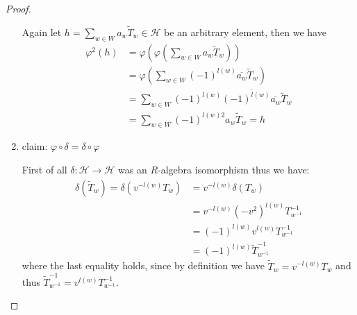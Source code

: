 \documentclass[]{article}
\begin{document}
\begin{proof}
\begin{enumerate}
        Again let \(h = \sum_{w \in W}^{} a_w \widetilde{T}_w\in \mathscr{H}\) be an arbitrary element, then we have
        \begin{align*}
            \varphi^2(h)&= \varphi\left( \varphi\left( \sum_{w \in W}^{} a_w \widetilde{T}_w\right)\right)  \\
            &=\varphi\left(\sum_{w \in W}^{} (-1)^{l(w)}\overline{a_w} \widetilde{T}_w\right) \\
            &=\sum_{w \in W}^{} (-1)^{l(w)}\overline{(-1)^{l(w)}\overline{a_w}} \widetilde{T}_w \\
            &=\sum_{w \in W}^{} (-1)^{l(w)2}a_w \widetilde{T}_w = h
        \end{align*}
        \item claim: \(\varphi \circ \delta = \delta \circ \varphi\)
        
        First of all \(\delta: \mathscr{H} \rightarrow \mathscr{H}\) was an \(R\)-algebra isomorphism thus we have:
        \begin{align*}
            \delta(\widetilde{T}_w)=\delta(v^{-l(w)}T_w) &=  v^{-l(w)} \delta(T_w) \\
            &= v^{-l(w)} (-v^2)^{l(w)} T_{w^{-1}}^{-1}\\
            &= (-1)^{l(w)} v^{l(w)}T_{w^{-1}}^{-1}\\
            &= (-1)^{l(w)} \widetilde{T}_{w^{-1}}^{-1}
        \end{align*}
        where the last equality holds, since by definition we have \(\widetilde{T}_w = v^{-l(w)} T_w\) and thus 
        \(\widetilde{T}^{-1}_{w^{-1}}=v^{l(w)}T^{-1}_{w^{-1}}\).
        
    \end{enumerate}
\end{proof}
\end{document}
